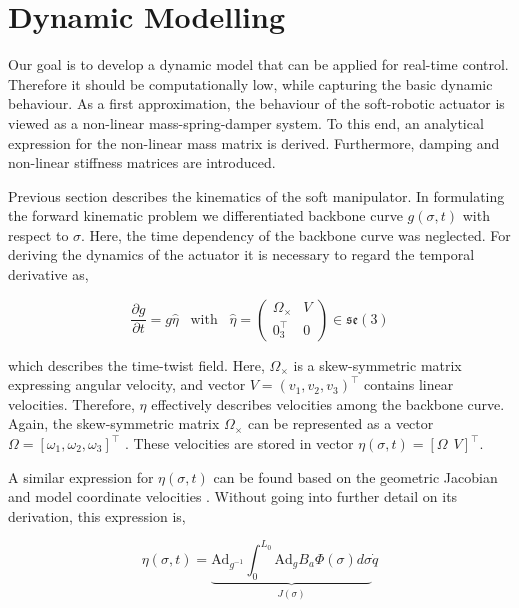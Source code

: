 \section{Dynamic Modelling}

Our goal is to develop a dynamic model that can be applied for real-time control. Therefore it should be computationally low, while capturing the basic dynamic behaviour. As a first approximation, the behaviour of the soft-robotic actuator is viewed as a non-linear mass-spring-damper system. To this end, an analytical expression for the non-linear mass matrix is derived. Furthermore, damping and non-linear stiffness matrices are introduced.


Previous section describes the kinematics of the soft manipulator. In formulating the forward kinematic problem we differentiated backbone curve $g(\sigma,t)$ with respect to $\sigma$. Here, the time dependency of the backbone curve was neglected. For deriving the dynamics of the actuator it is necessary to regard the temporal derivative as,


\begin{equation}
    \frac{\partial g}{\partial t} = g \hat{\eta} \hspace{10pt} \text{with} \hspace{10pt}  \hat{\eta} = \begin{pmatrix} \Omega_\times & V \\ 0_3^\top & 0 \end{pmatrix} \in  \mathfrak{se}(3)
    \label{eq2:dgdt}
\end{equation}

which describes the time-twist field. Here, $\Omega_\times$ is a skew-symmetric matrix expressing angular velocity, and vector $V = (v_1,v_2,v_3)^\top $ contains linear velocities. Therefore, $\eta$ effectively describes velocities among the backbone curve. Again, the skew-symmetric matrix $\Omega_\times$ can be represented as a vector $\Omega = [\omega_1,\omega_2,\omega_3]^\top$ \cite{Sola2018}. These velocities are stored in vector $\eta(\sigma,t) = [\Omega \hspace{5pt} V]^\top$.

A similar expression for $\eta(\sigma,t)$ can be found based on the geometric Jacobian and model coordinate velocities \cite{Boyer2019} \cite{Caasenbrood2020}. Without going into further detail on its derivation, this expression is,

\begin{equation}
    \eta(\sigma,t) = \underbrace{\text{Ad}_{g^{-1}} \int_0^{L_0} \text{Ad}_{g} B_a \Phi(\sigma) d \sigma}_{J(\sigma)} \dot{q}
    \label{eq2:J}
\end{equation}

